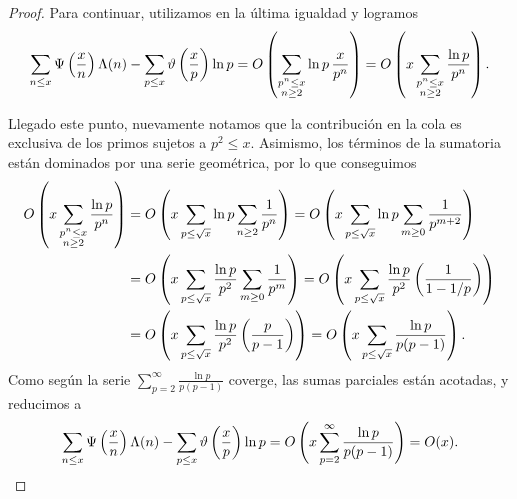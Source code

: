 \begin{proof}
  Para continuar, utilizamos  en la \'ultima igualdad y logramos 
  \[
    \sum_{n \leq x} \Psi\left( \frac{x}{n} \right)\Lambda(n)
    - \sum_{p \leq x} \vartheta\left( \frac{x}{p} \right) \ln p
    = O\left( \sum_{\substack{p^n \leq x \\ n \geq 2}} \ln p \, \frac{x}{p^n} \right)
    = O\left( x \sum_{\substack{p^n \leq x \\ n \geq 2}} \frac{\ln p}{p^n} \right).
  \]
  
  Llegado este punto, nuevamente notamos que la contribuci\'on
  en la cola es exclusiva de los primos sujetos a \(p^2 \le x\).
  Asimismo, los t\'erminos de la sumatoria est\'an dominados por una serie geom\'etrica,
  por lo que conseguimos
  \begin{align*}
    O\left( x \sum_{\substack{p^n \leq x \\ n \geq 2}} \frac{\ln p}{p^n} \right)
    &= O\left( x \sum_{p \leq \sqrt{x}} \ln p \sum_{n \geq 2} \frac{1}{p^n} \right)
    = O\left( x \sum_{p \leq \sqrt{x}} \ln p \sum_{m \geq 0} \frac{1}{p^{m + 2}} \right) \\
    &= O\left( x \sum_{p \leq \sqrt{x}} \frac{\ln p}{p^2} \sum_{m \geq 0} \frac{1}{p^m} \right)
    = O\left( x \sum_{p \leq \sqrt{x}} \frac{\ln p}{p^2} \left( \frac{1}{1 - 1/p} \right) \right) \\
    &= O\left( x \sum_{p \leq \sqrt{x}} \frac{\ln p}{p^2} \left( \frac{p}{p - 1} \right) \right)
    = O\left( x \sum_{p \leq \sqrt{x}} \frac{\ln p}{p (p - 1)} \right).
  \end{align*}
  Como seg\'un  la serie
  \(\displaystyle{\sum_{p = 2}^{\infty} \frac{\ln p}{p (p - 1)}}\) coverge,
  las sumas parciales est\'an acotadas,
  y reducimos a
  \[
    \sum_{n \leq x} \Psi\left( \frac{x}{n} \right)\Lambda(n)
    - \sum_{p \leq x} \vartheta\left( \frac{x}{p} \right) \ln p
    = O\left( x \sum_{p = 2}^\infty \frac{\ln p}{p (p - 1)} \right)
    = O(x).
  \]
  

\end{proof}
